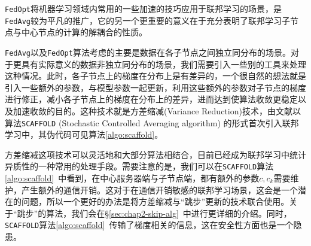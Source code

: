 \texttt{FedOpt}将机器学习领域内常用的一些加速的技巧应用于联邦学习的场景，是\texttt{FedAvg}较为平凡的推广，它的另一个更重要的意义在于充分表明了联邦学习子节点与中心节点的计算的解耦合的性质。

\texttt{FedAvg}以及\texttt{FedOpt}算法考虑的主要是数据在各子节点之间独立同分布的场景。对于更具有实际意义的数据非独立同分布的场景，我们需要引入一些别的工具来处理这种情况。此时，各子节点上的梯度在分布上是有差异的，一个很自然的想法就是引入一些额外的参数，与模型参数一起更新，利用这些额外的参数对子节点的梯度进行修正，减小各子节点上的梯度在分布上的差异，进而达到使算法收敛更稳定以及加速收敛的目的。这种技术就是方差缩减(Variance Reduction)技术\cite{johnson2013accelerating}，由文献\parencite{karimireddy2020scaffold}以算法\texttt{SCAFFOLD} (Stochastic Controlled Averaging algorithm) 的形式首次引入联邦学习中，其伪代码可见算法\ref{algo:scaffold}。



方差缩减这项技术可以灵活地和大部分算法相结合，目前已经成为联邦学习中统计异质性的一种常用的处理手段。需要注意的是，我们可以在\texttt{SCAFFOLD}算法\ref{algo:scaffold}~中看到，在中心服务器端与子节点端，都有额外的参数$c, c_k$需要维护，产生额外的通信开销。这对于在通信开销敏感的联邦学习场景，这会是一个潜在的问题，所以一个更好的办法是将方差缩减与``跳步''更新的技术联合使用\cite{proxskip-vr}。关于``跳步''的算法，我们会在\S\ref{sec:chap2-skip-alg}~中进行更详细的介绍。同时，\texttt{SCAFFOLD}算法\ref{algo:scaffold}~传输了梯度相关的信息，这在安全性方面\cite{zhu2019deep_leakage}也是一个隐患。
